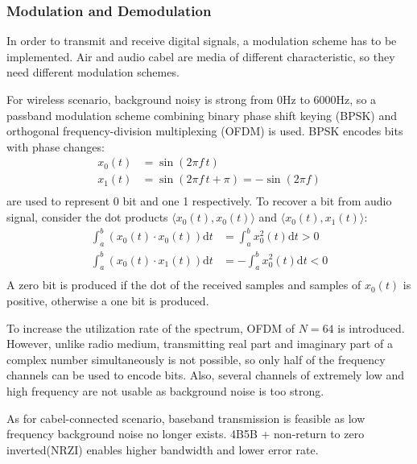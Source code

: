 \subsubsection{Modulation and Demodulation}
In order to transmit and receive digital signals, a modulation scheme has to be implemented.
Air and audio cabel are media of different characteristic, so they need different modulation schemes.\par
For wireless scenario, background noisy is strong from 0Hz to 6000Hz,
so a passband modulation scheme
combining binary phase shift keying (BPSK) and orthogonal frequency-division multiplexing (OFDM)
is used.
BPSK encodes bits with phase changes:
\begin{align*}
	x_0(t) & =\sin(2\pi f\, t)                       \\
	x_1(t) & =\sin(2\pi f\, t + \pi) = -\sin(2\pi f) \\
\end{align*}
are used to represent 0 bit and one 1 respectively.
To recover a bit from audio signal, consider the dot products $\langle x_0(t),x_0(t)\rangle$ and $\langle x_0(t),x_1(t) \rangle$:
\begin{align*}
	\int_a^b \left( x_0(t)\cdot x_0(t) \right) \mathrm{d}t & =  \int_a^b x_0^2(t) \mathrm{d}t > 0 \\
	\int_a^b \left( x_0(t)\cdot x_1(t) \right) \mathrm{d}t & = -\int_a^b x_0^2(t) \mathrm{d}t < 0 \\
\end{align*}
A zero bit is produced if the dot of the received samples and samples of $x_0(t)$ is positive, otherwise a one bit is produced.\par
To increase the utilization rate of the spectrum, OFDM of $N=64$ is introduced.
However, unlike radio medium, transmitting real part and imaginary part of a complex number simultaneously is not possible,
so only half of the frequency channels can be used to encode bits.
Also, several channels of extremely low and high frequency are not usable as background noise is too strong.\par
As for cabel-connected scenario, baseband transmission is feasible as low frequency background noise no longer exists.
4B5B + non-return to zero inverted(NRZI) enables higher bandwidth and lower error rate.

